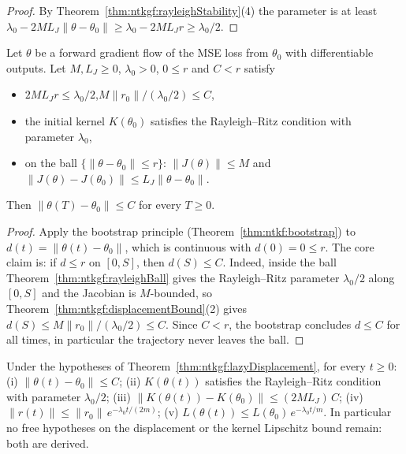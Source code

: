 \begin{proof}
  \leanok
By Theorem~\ref{thm:ntkgf:rayleighStability}(4) the parameter is at least $\lambda_0-2ML_J\|\theta-\theta_0\|\ge\lambda_0-2ML_Jr\ge\lambda_0/2$.
\end{proof}

\begin{theorem}\label{thm:ntkgf:lazyDisplacement}
  \leanok
Let $\theta$ be a forward gradient flow of the MSE loss from $\theta_0$ with differentiable outputs. Let $M,L_J\ge0$, $\lambda_0>0$, $0\le r$ and $C<r$ satisfy
\begin{itemize}
  \item $2ML_Jr\le\lambda_0/2$,\qquad $M\|r_0\|/(\lambda_0/2)\le C$,
  \item the initial kernel $K(\theta_0)$ satisfies the Rayleigh--Ritz condition with parameter $\lambda_0$,
  \item on the ball $\{\|\theta-\theta_0\|\le r\}$: $\|J(\theta)\|\le M$ and $\|J(\theta)-J(\theta_0)\|\le L_J\|\theta-\theta_0\|$.
\end{itemize}
Then $\|\theta(T)-\theta_0\|\le C$ for every $T\ge0$.
\end{theorem}

\begin{proof}
  \leanok
Apply the bootstrap principle (Theorem~\ref{thm:ntkf:bootstrap}) to $d(t)=\|\theta(t)-\theta_0\|$, which is continuous with $d(0)=0\le r$. The core claim is: if $d\le r$ on $[0,S]$, then
$d(S)\le C$. Indeed, inside the ball Theorem~\ref{thm:ntkgf:rayleighBall} gives the Rayleigh--Ritz parameter $\lambda_0/2$ along $[0,S]$ and the Jacobian is $M$-bounded, so
Theorem~\ref{thm:ntkgf:displacementBound}(2) gives $d(S)\le M\|r_0\|/(\lambda_0/2)\le C$. Since $C<r$, the bootstrap concludes $d\le C$ for all times, in particular the trajectory
never leaves the ball.
\end{proof}

\begin{theorem}\label{thm:ntkgf:lazyGlobal}
  \leanok
Under the hypotheses of Theorem~\ref{thm:ntkgf:lazyDisplacement}, for every $t\ge0$:
(i) $\|\theta(t)-\theta_0\|\le C$;
(ii) $K(\theta(t))$ satisfies the Rayleigh--Ritz condition with parameter $\lambda_0/2$;
(iii) $\|K(\theta(t))-K(\theta_0)\|\le(2ML_J)\,C$;
(iv) $\|r(t)\|\le\|r_0\|\,e^{-\lambda_0t/(2m)}$;
(v) $L(\theta(t))\le L(\theta_0)\,e^{-\lambda_0t/m}$.
In particular no free hypotheses on the displacement or the kernel Lipschitz bound remain: both are derived.
\end{theorem}

